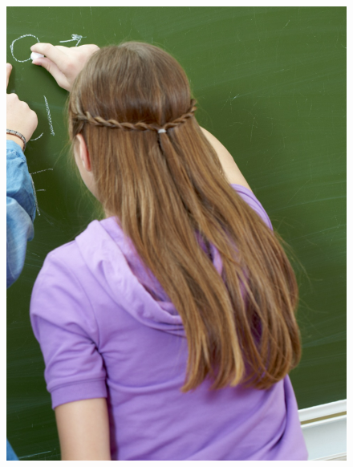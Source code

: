 \begin{figure}[htpb]
\vspace*{-2.5cm}
\hspace{-3cm}\includegraphics[height=\paperheight]{../separadores/separadorCNT9B.png}
\end{figure}

 \setcounter{chapter}{0}

 

 
 
 
 



